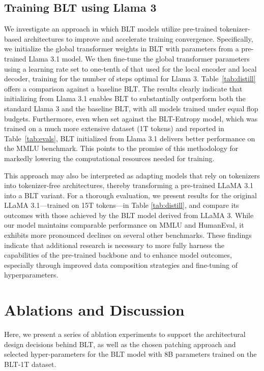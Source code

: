 \subsection{Training {\textsc BLT} using Llama 3}
\label{sec:distillation}
We investigate an approach in which {\textsc BLT} models utilize pre-trained tokenizer-based architectures to improve and accelerate training convergence. Specifically, we initialize the global transformer weights in {\textsc BLT} with parameters from a pre-trained Llama 3.1 model. We then fine-tune the global transformer parameters using a learning rate set to one-tenth of that used for the local encoder and local decoder, training for the number of steps optimal for Llama 3. Table~\ref{tab:distill} offers a comparison against a baseline {\textsc BLT}. The results clearly indicate that initializing from Llama 3.1 enables {\textsc BLT} to substantially outperform both the standard Llama 3 and the baseline {\textsc BLT}, with all models trained under equal flop budgets. Furthermore, even when set against the {\textsc BLT}-Entropy model, which was trained on a much more extensive dataset (1T tokens) and reported in Table~\ref{tab:evals}, {\textsc BLT} initialized from Llama 3.1 delivers better performance on the MMLU benchmark. This points to the promise of this methodology for markedly lowering the computational resources needed for training.

This approach may also be interpreted as adapting models that rely on tokenizers into tokenizer-free architectures, thereby transforming a pre-trained LLaMA 3.1 into a {\textsc BLT} variant. For a thorough evaluation, we present results for the original LLaMA 3.1—trained on 15T tokens—in Table \ref{tab:distill}, and compare its outcomes with those achieved by the {\textsc BLT} model derived from LLaMA 3. While our model maintains comparable performance on MMLU and HumanEval, it exhibits more pronounced declines on several other benchmarks. These findings indicate that additional research is necessary to more fully harness the capabilities of the pre-trained backbone and to enhance model outcomes, especially through improved data composition strategies and fine-tuning of hyperparameters.

\section{Ablations and Discussion}
\label{section:ablations}
Here, we present a series of ablation experiments to support the architectural design decisions behind {\textsc BLT}, as well as the chosen patching approach and selected hyper-parameters for the {\textsc BLT} model with 8B parameters trained on the {\textsc BLT}-1T dataset.

